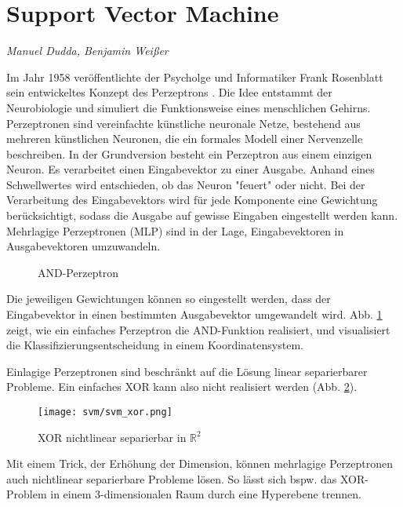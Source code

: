 \section{Support Vector Machine}
\label{mainsec:svm}
\textit{Manuel Dudda, Benjamin Weißer}

Im Jahr 1958 veröffentlichte der Psycholge und Informatiker Frank Rosenblatt sein entwickeltes Konzept des Perzeptrons \cite{rosenblatt58a}. 
Die Idee entstammt der Neurobiologie und simuliert die Funktionsweise eines menschlichen Gehirns. 
Perzeptronen sind vereinfachte künstliche neuronale Netze, bestehend aus mehreren künstlichen Neuronen, die ein formales Modell einer Nervenzelle beschreiben. 
In der Grundversion besteht ein Perzeptron aus einem einzigen Neuron. 
Es verarbeitet einen Eingabevektor zu einer Ausgabe. 
Anhand eines Schwellwertes wird entschieden, ob das Neuron "{}feuert"{} oder nicht. 
Bei der Verarbeitung des Eingabevektors wird für jede Komponente eine Gewichtung berücksichtigt, sodass die Ausgabe auf gewisse Eingaben eingestellt werden kann. 
Mehrlagige Perzeptronen (\ac{MLP}) sind in der Lage, Eingabevektoren in Ausgabevektoren umzuwandeln. 

\begin{figure}[htbp] \centering
    \caption{AND-Perzeptron}
    \label{fig:perceptron_and}
\end{figure}

Die jeweiligen Gewichtungen können so eingestellt werden, dass der Eingabevektor in einen bestimmten Ausgabevektor umgewandelt wird. 
Abb. \ref{fig:perceptron_and} zeigt, wie ein einfaches Perzeptron die AND-Funktion realisiert, und visualisiert die Klassifizierungsentscheidung in einem Koordinatensystem. 

Einlagige Perzeptronen sind beschränkt auf die Lösung linear separierbarer Probleme. 
Ein einfaches XOR kann also nicht realisiert werden (Abb. \ref{fig:perceptron_xor}). 

\begin{figure}[htbp] \centering
    \texttt{[image: svm/svm\_xor.png]}
    \caption{XOR nichtlinear separierbar in $\mathbb{R}^2$}
    \label{fig:perceptron_xor}
\end{figure}


Mit einem Trick, der Erhöhung der Dimension, können mehrlagige Perzeptronen auch nichtlinear separierbare Probleme lösen. 
So lässt sich bspw. das XOR-Problem in einem 3-dimensionalen Raum durch eine Hyperebene trennen.

